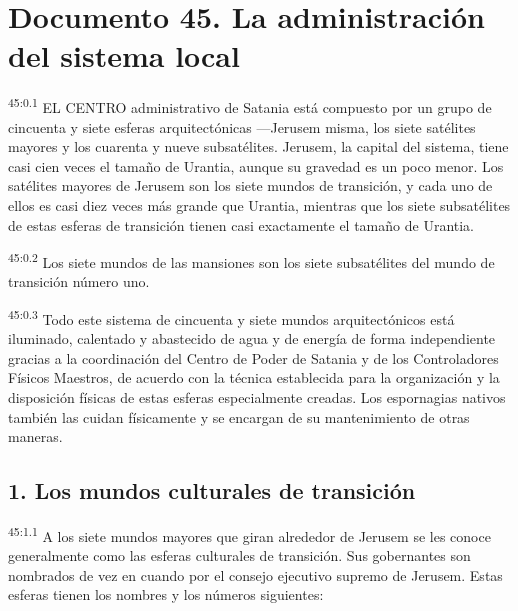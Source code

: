 \chapter{Documento 45. La administración del sistema local}
\par
\textsuperscript{45:0.1} EL CENTRO administrativo de Satania está compuesto por un grupo de cincuenta y siete esferas arquitectónicas ---Jerusem misma, los siete satélites mayores y los cuarenta y nueve subsatélites. Jerusem, la capital del sistema, tiene casi cien veces el tamaño de Urantia, aunque su gravedad es un poco menor. Los satélites mayores de Jerusem son los siete mundos de transición, y cada uno de ellos es casi diez veces más grande que Urantia, mientras que los siete subsatélites de estas esferas de transición tienen casi exactamente el tamaño de Urantia.

\par
\textsuperscript{45:0.2} Los siete mundos de las mansiones son los siete subsatélites del mundo de transición número uno.

\par
\textsuperscript{45:0.3} Todo este sistema de cincuenta y siete mundos arquitectónicos está iluminado, calentado y abastecido de agua y de energía de forma independiente gracias a la coordinación del Centro de Poder de Satania y de los Controladores Físicos Maestros, de acuerdo con la técnica establecida para la organización y la disposición físicas de estas esferas especialmente creadas. Los espornagias nativos también las cuidan físicamente y se encargan de su mantenimiento de otras maneras.

\section*{1. Los mundos culturales de transición}
\par
\textsuperscript{45:1.1} A los siete mundos mayores que giran alrededor de Jerusem se les conoce generalmente como las esferas culturales de transición. Sus gobernantes son nombrados de vez en cuando por el consejo ejecutivo supremo de Jerusem. Estas esferas tienen los nombres y los números siguientes:

